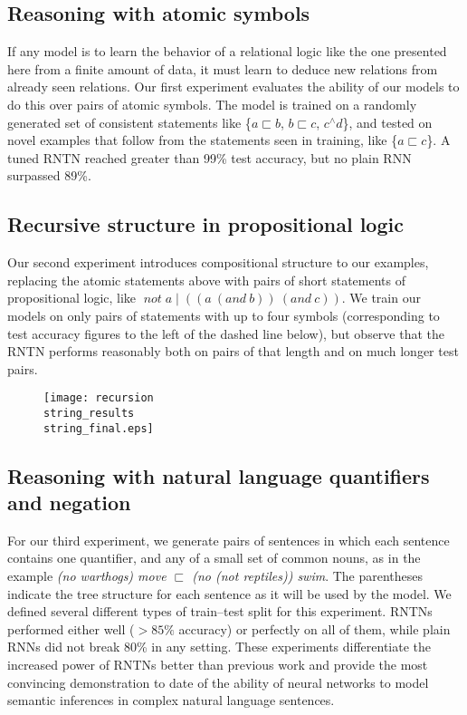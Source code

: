 \documentclass{article} %
\newcommand{\natneg}{\mathbin{^{\wedge}}}
\newcommand{\natfor}{\sqsubset}
\newcommand{\natalt}{\mathbin{|}}
\newcommand{\plneg}{\mathop{\textit{not}}}
\newcommand{\pland}{\mathbin{\textit{and}}}
\begin{document}
\subsection*{Reasoning with atomic symbols}

If any model is to learn the behavior of a relational logic like the one presented here from a finite amount of data, it must learn to deduce new relations from already seen relations. Our first experiment evaluates the ability of our models to do this over pairs of atomic symbols. The model is trained on a randomly generated set of consistent statements like \{$a \natfor b$, $b \natfor c$, $c \natneg d$\}, and tested on novel examples that follow from the statements seen in training, like \{$a \natfor c$\}. A tuned RNTN reached greater than 99\% test accuracy, but no plain RNN surpassed 89\%.

\subsection*{Recursive structure in propositional logic}\label{sec:recursion}

Our second experiment introduces compositional structure to our examples, replacing the atomic statements above with pairs of short statements of propositional logic, like $\plneg a\natalt((a~(\pland~ b))~(\pland~c))$. We train our models on only pairs of statements with up to four symbols (corresponding to test accuracy figures to the left of the dashed line below), but observe that the RNTN performs reasonably both on pairs of that length and on much longer test pairs. 

\begin{figure}[h]
  \centering
  \texttt{[image: recursion\\string\_results\\string\_final.eps]}
  \label{prop-results}
\end{figure} \vspace{-.3cm}

\subsection*{Reasoning with natural language quantifiers and negation}\label{sec:quantifiers}

For our third experiment, we generate pairs of sentences in which each sentence contains one quantifier, and any of a small set of common nouns, as in the example \textit{(no warthogs) move $\natfor$ (no (not reptiles)) swim}. The parentheses indicate the tree structure for each sentence as it will be used by the model. We defined several different types of train--test split for this experiment. RNTNs performed either well ($>85\%$ accuracy) or perfectly on all of them, while plain RNNs did not break 80\% in any setting. These experiments differentiate the increased power of RNTNs better than previous work and provide the most convincing demonstration to date of the ability of neural networks to model semantic inferences in complex natural language sentences.




\small %
 
\end{document}
